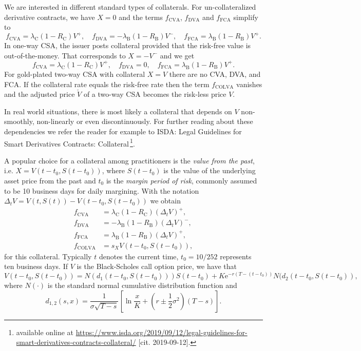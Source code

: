 \documentclass[a4paper,10pt]{article}
\newcommand{\e}{\mathrm{e}}
\newcommand{\1}{\mathbf{1}}
\begin{document}
We are interested in different standard types of collaterals. For un-collateralized derivative contracts, we have $X=0$ and the terms $f_\text{CVA}$, $f_\text{DVA}$ and $f_\text{FCA}$ simplify to
\begin{equation*}
f_\text{CVA}=\lambda_\text{C}(1-R_\text{C})V^+, \quad f_\text{DVA}=-\lambda_\text{B}(1-R_\text{B})V^-, \quad f_\text{FCA}=\lambda_\text{B}(1-R_\text{B})V^+.
\end{equation*}
In one-way CSA, the issuer posts collateral provided that the risk-free value is out-of-the-money. That corresponds to $X=-V^-$ and we get
\begin{equation*}
f_\text{CVA}=\lambda_\text{C}(1-R_\text{C})V^+, \quad f_\text{DVA}=0, \quad f_\text{FCA}=\lambda_\text{B}(1-R_\text{B})V^+.
\end{equation*}
For gold-plated two-way CSA with collateral $X=V$ there are no CVA, DVA, and FCA. If the collateral rate equals the risk-free rate then the term $f_\text{COLVA}$ vanishes and the adjusted price $\check{V}$ of a two-way CSA becomes the risk-less price $V$.

In real world situations, there is most likely a collateral that depends on $V$ non-smoothly, non-linearly or even discontinuously. For further reading about these dependencies we refer the reader for example to ISDA: Legal Guidelines for Smart Derivatives Contracts: Collateral\,\footnote{available online at \url{https://www.isda.org/2019/09/12/legal-guidelines-for-smart-derivatives-contracts-collateral/} [cit. 2019-09-12].}.

A popular choice for a collateral among practitioners is the \emph{value from the past}, i.e. $X = V(t-t_0,S(t-t_0))$, where $S(t-t_0)$ is the value of the underlying asset price from the past and $t_0$ is the \emph{margin period of risk}, commonly assumed to be 10 business days for daily margining. With the notation $\Delta_t V=V(t,S(t))-V(t-t_0,S(t-t_0))$ we obtain
\begin{align*}
f_\text{CVA} &= \lambda_\text{C}(1-R_\text{C})(\Delta_t V)^+, \\
f_\text{DVA} &= -\lambda_\text{B}(1-R_\text{B})(\Delta_t V)^-, \\
f_\text{FCA} &= \lambda_\text{B}(1-R_\text{B})(\Delta_t V)^+, \\
f_\text{COLVA} &= s_X V(t-t_0,S(t-t_0)),
\end{align*}
for this collateral. Typically $t$ denotes the current time, $t_0=10/252$ represents ten business days. If $V$ is the Black-Scholes call option price, we have that
\begin{equation}\label{e:NPV} 
V(t-t_0,S(t-t_0)) = N(d_1(t-t_0,S(t-t_0))) S(t-t_0) + K\e^{-r(T-(t-t_0))} N(d_2(t-t_0,S(t-t_0)), 
\end{equation}
where $N(\cdot)$ is the standard normal cumulative distribution function and 
\[ d_{1,2}(s,x) = \frac1{\sigma\sqrt{T-s}} \left[ \ln\frac{x}{K} + \left( r \pm \frac12 \sigma^2\right)(T-s) \right]. \]
\end{document}
